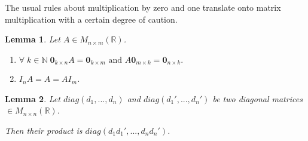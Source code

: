 \documentclass[11pt,a4paper]{article}
\newcommand\R{\mathbb{R}}
\newcommand\N{\mathbb{N}}
\newtheorem{lemma}{Lemma}
\theoremstyle{definition}
\begin{document}
The usual rules about multiplication by zero and one translate onto matrix multiplication with a certain degree of caution. 

\begin{lemma}
    Let $ A \in M_{n \times m} (\R) $.
    \begin{enumerate}
        \item $ \forall \; k \in \N \; \textbf{0}_{k \times n} A = \textbf{0}_{k \times m} \text{ and } A\textbf{0}_{m \times k}  = \textbf{0}_{n \times k}. $
        \item $ I_n A = A = A I_m $.
    \end{enumerate}
\end{lemma}
\begin{lemma}
    Let $ diag(d_1, ..., d_n) $ and $ diag(d_1', ..., d_n') $ be two diagonal matrices $ \in M_{n \times n} (\R) $. 
    
    Then their product is $ diag(d_1 d_1', ..., d_n d_n') $.
\end{lemma}
\end{document}
